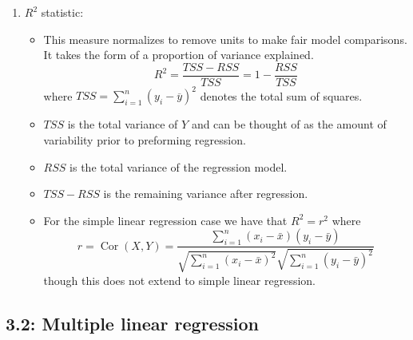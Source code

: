 \documentclass{article}
\begin{document}
\begin{enumerate}
\begin{enumerate}
\item $R^2$ statistic:
\begin{itemize}
\item This measure normalizes to remove units to make fair model comparisons. It takes the form of a proportion of variance explained.
\[
R^2 = \frac{TSS-RSS}{TSS} = 1 - \frac{RSS}{TSS}
\]
where $TSS=\sum_{i=1}^n (y_i-\overline{y})^2$ denotes the total sum of squares.
\item $TSS$ is the total variance of $Y$ and can be thought of as the amount of variability prior to preforming regression.
\item $RSS$ is the total variance of the regression model.
\item $TSS-RSS$ is the remaining variance after regression.
\item For the simple linear regression case we have that $R^2=r^2$ where
\[
r = \operatorname{Cor}(X, Y) = \frac{\sum_{i=1}^n (x_i - \bar{x})(y_i - \bar{y})}{\sqrt{\sum_{i=1}^n (x_i - \bar{x})^2} \sqrt{\sum_{i=1}^n (y_i - \bar{y})^2}}
\]
though this does not extend to simple linear regression.
\end{itemize}
\end{enumerate}

\end{enumerate}

\subsection*{3.2: Multiple linear regression}
\end{document}
